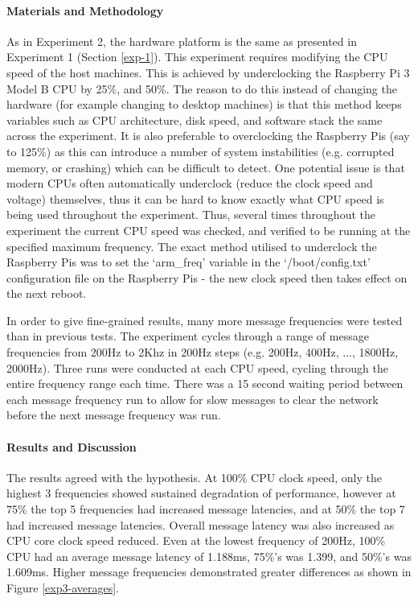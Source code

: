 \documentclass[../dissertation.tex]{subfiles}
\begin{document}
\paragraph{Materials and Methodology} As in Experiment 2, the hardware platform is the same as presented in Experiment 1 (Section \ref{exp-1}). This experiment requires modifying the CPU speed of the host machines. This is achieved by underclocking the Raspberry Pi 3 Model B CPU by 25\%, and 50\%. The reason to do this instead of changing the hardware (for example changing to desktop machines) is that this method keeps variables such as CPU architecture, disk speed, and software stack the same across the experiment. It is also preferable to overclocking the Raspberry Pis (say to 125\%) as this can introduce a number of system instabilities (e.g. corrupted memory, or crashing) which can be difficult to detect. One potential issue is that modern CPUs often automatically underclock (reduce the clock speed and voltage) themselves, thus it can be hard to know exactly what CPU speed is being used throughout the experiment. Thus, several times throughout the experiment the current CPU speed was checked, and verified to be running at the specified maximum frequency. The exact method utilised to underclock the Raspberry Pis was to set the `arm\_freq' variable in the `/boot/config.txt' configuration file on the Raspberry Pis - the new clock speed then takes effect on the next reboot.

In order to give fine-grained results, many more message frequencies were tested than in previous tests. The experiment cycles through a range of message frequencies from 200Hz to 2Khz in 200Hz steps (e.g. 200Hz, 400Hz, ..., 1800Hz, 2000Hz). Three runs were conducted at each CPU speed, cycling through the entire frequency range each time. There was a 15 second waiting period between each message frequency run to allow for slow messages to clear the network before the next message frequency was run.

\paragraph{Results and Discussion} The results agreed with the hypothesis. At 100\% CPU clock speed, only the highest 3 frequencies showed sustained degradation of performance, however at 75\% the top 5 frequencies had increased message latencies, and at 50\% the top 7 had increased message latencies. Overall message latency was also increased as CPU core clock speed reduced. Even at the lowest frequency of 200Hz, 100\% CPU had an average message latency of 1.188ms, 75\%'s was 1.399, and 50\%'s was 1.609ms. Higher message frequencies demonstrated greater differences as shown in Figure \ref{exp3-averages}.
\end{document}
